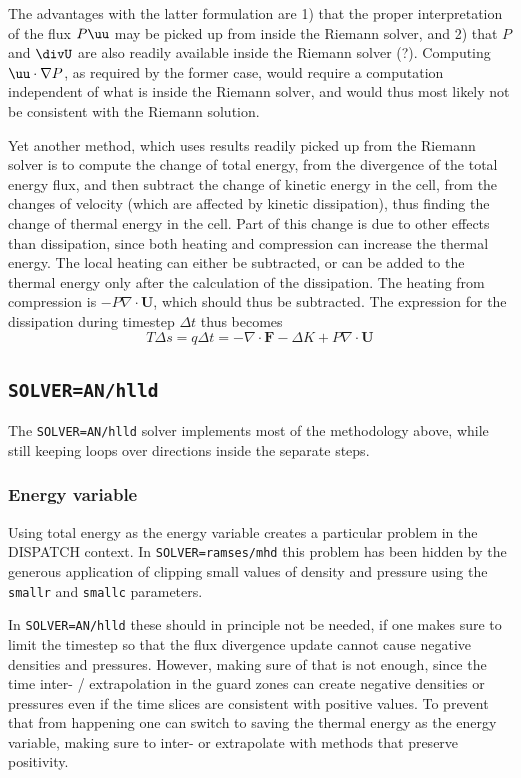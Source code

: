 \documentclass[paper=a4,fontsize=11pt]{scrartcl}
\numberwithin{equation}{section}		%
\numberwithin{figure}{section}			%
\numberwithin{table}{section}				%
\newcommand{\codecolor}{\color{Blue}}
\newcommand{\Code}[1]{{\codecolor\texttt{#1}}}
\begin{document}
The advantages with the latter formulation are 1) that the proper interpretation of the flux $P\uu$ may be picked up from inside the Riemann solver, and 2) that $P$ and $\divU$ are also readily available inside the Riemann solver (?). Computing $\uu\cdot\nabla P$, as required by the former case, would require a computation independent of what is inside the Riemann solver, and would thus most likely not be consistent with the Riemann solution.

Yet another method, which uses results readily picked up from the Riemann solver is to compute the change of total energy, from the divergence of the total energy flux, and then subtract the change of kinetic energy in the cell, from the changes of velocity (which are affected by kinetic dissipation), thus finding the change of thermal energy in the cell.  Part of this change is due to other effects than dissipation, since both heating and compression can increase the thermal energy.  The local heating can either be subtracted, or can be added to the thermal energy only after the calculation of the dissipation.  The heating from compression is $-P \nabla\cdot \mathbf{U}$, which should thus be subtracted.  The expression for the dissipation during timestep $\Delta t$ thus becomes
\begin{equation}
    T\Delta s = q \Delta t = -\nabla\cdot\mathbf{F}- \Delta K + P \nabla\cdot \mathbf{U}
\end{equation}
\subsection{\Code{SOLVER=AN/hlld}}
The \Code{SOLVER=AN/hlld} solver implements most of the methodology above, while still keeping loops over directions inside the separate steps.

\subsubsection{Energy variable}
Using total energy as the energy variable creates a particular problem in the DISPATCH context.  In \Code{SOLVER=ramses/mhd} this problem has been hidden by the generous application of clipping small values of density and pressure using the \Code{smallr} and \Code{smallc} parameters.  

In \Code{SOLVER=AN/hlld} these should in principle not be needed, if one makes sure to limit the timestep so that the flux divergence update cannot cause negative densities and pressures.  However, making sure of that is not enough, since the time inter- / extrapolation in the guard zones can create negative densities or pressures even if the time slices are consistent with positive values.  To prevent that from happening one can switch to saving the thermal energy as the energy variable, making sure to inter- or extrapolate with methods that preserve positivity.
\end{document}
